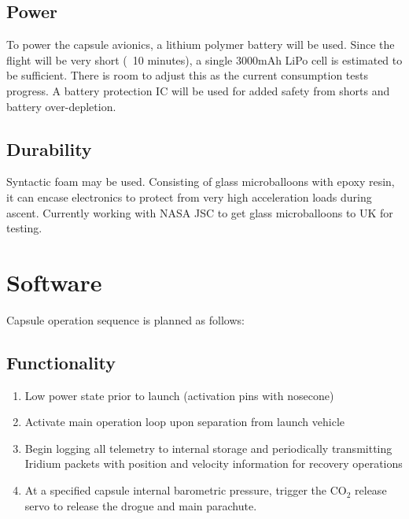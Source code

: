 \documentclass{article}
\begin{document}
\subsection{Power}
To power the capsule avionics, a lithium polymer battery will be used. Since the flight will be very short (~10 minutes), a single 3000mAh LiPo cell is estimated to be sufficient. There is room to adjust this as the current consumption tests progress. A battery protection IC will be used for added safety from shorts and battery over-depletion.


\subsection{Durability}
Syntactic foam may be used. Consisting of glass microballoons with epoxy resin, it can encase electronics to protect from very high acceleration loads during ascent. Currently working with NASA JSC to get glass microballoons to UK for testing. 




\section{Software}
\label{sec:software}

Capsule operation sequence is planned as follows:

\subsection{Functionality}

\begin{enumerate}
	\item Low power state prior to launch (activation pins with nosecone)
	\item Activate main operation loop upon separation from launch vehicle
	\item Begin logging all telemetry to internal storage and periodically transmitting Iridium packets with position and velocity information for recovery operations
	\item At a specified capsule internal barometric pressure, trigger the CO$_2$ release servo to release the drogue and main parachute.
\end{enumerate}
\end{document}
